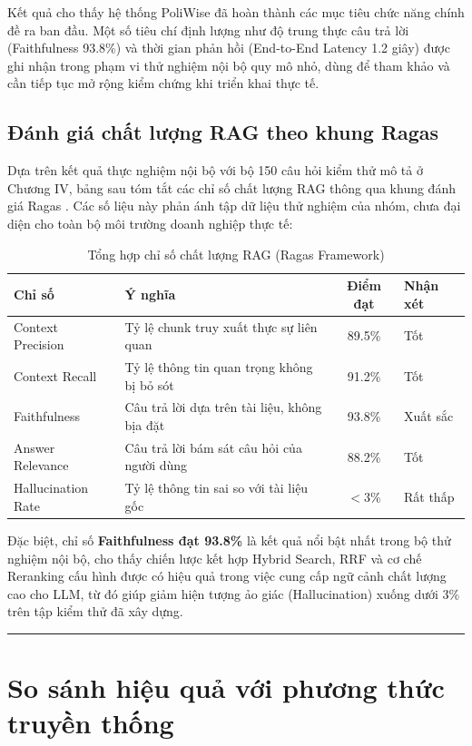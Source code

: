 \documentclass[12pt,a4paper]{report}
\begin{document}
Kết quả cho thấy hệ thống PoliWise đã hoàn thành các mục tiêu chức năng chính đề ra ban đầu. Một số tiêu chí định lượng như độ trung thực câu trả lời (Faithfulness 93.8\%) và thời gian phản hồi (End-to-End Latency 1.2 giây) được ghi nhận trong phạm vi thử nghiệm nội bộ quy mô nhỏ, dùng để tham khảo và cần tiếp tục mở rộng kiểm chứng khi triển khai thực tế.

\subsection{Đánh giá chất lượng RAG theo khung Ragas}

Dựa trên kết quả thực nghiệm nội bộ với bộ 150 câu hỏi kiểm thử mô tả ở Chương IV, bảng sau tóm tắt các chỉ số chất lượng RAG thông qua khung đánh giá Ragas \cite{ragas2024}. Các số liệu này phản ánh tập dữ liệu thử nghiệm của nhóm, chưa đại diện cho toàn bộ môi trường doanh nghiệp thực tế:

\begin{table}[H]
\centering
\caption{Tổng hợp chỉ số chất lượng RAG (Ragas Framework)}
\label{tab:ragas_summary}
\begin{tabularx}{\textwidth}{|l|X|c|l|}
\hline
\rowcolor{gray!10}
Chỉ số & Ý nghĩa & Điểm đạt & Nhận xét \\ \hline
Context Precision & Tỷ lệ chunk truy xuất thực sự liên quan & 89.5\% & Tốt \\ \hline
Context Recall & Tỷ lệ thông tin quan trọng không bị bỏ sót & 91.2\% & Tốt \\ \hline
Faithfulness & Câu trả lời dựa trên tài liệu, không bịa đặt & 93.8\% & Xuất sắc \\ \hline
Answer Relevance & Câu trả lời bám sát câu hỏi của người dùng & 88.2\% & Tốt \\ \hline
Hallucination Rate & Tỷ lệ thông tin sai so với tài liệu gốc & $<$3\% & Rất thấp \\ \hline
\end{tabularx}
\end{table}

Đặc biệt, chỉ số \textbf{Faithfulness đạt 93.8\%} là kết quả nổi bật nhất trong bộ thử nghiệm nội bộ, cho thấy chiến lược kết hợp Hybrid Search, RRF và cơ chế Reranking cấu hình được có hiệu quả trong việc cung cấp ngữ cảnh chất lượng cao cho LLM, từ đó giúp giảm hiện tượng ảo giác (Hallucination) xuống dưới 3\% trên tập kiểm thử đã xây dựng.

\rule{\textwidth}{0.5pt}

\section{So sánh hiệu quả với phương thức truyền thống}
\end{document}
